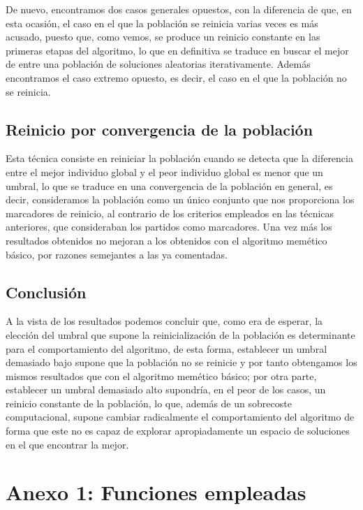 \documentclass[11pt,a4paper]{article}
\begin{document}
		\noindent De nuevo, encontramos dos casos generales opuestos, con la diferencia de que, en esta ocasión, el caso en el que la población se reinicia varias veces es más acusado, puesto que, como vemos, se produce un reinicio constante en las primeras etapas del algoritmo, lo que en definitiva se traduce en buscar el mejor de entre una población de soluciones aleatorias iterativamente. Además encontramos el caso extremo opuesto, es decir, el caso en el que la población no se reinicia.
	
	\subsection{Reinicio por convergencia de la población}
	
	\noindent Esta técnica consiste en reiniciar la población cuando se detecta que la diferencia entre el mejor individuo global y el peor individuo global es menor que un umbral, lo que se traduce en una convergencia de la población en general, es decir, consideramos la población como un único conjunto que nos proporciona los marcadores de reinicio, al contrario de los criterios empleados en las técnicas anteriores, que consideraban los partidos como marcadores. Una vez más los resultados obtenidos no mejoran a los obtenidos con el algoritmo memético básico, por razones semejantes a las ya comentadas.
	
	
	\subsection{Conclusión}
		
		\noindent  A la vista de los resultados podemos concluir que, como era de esperar, la elección del umbral que supone la reinicialización de la población es determinante para el comportamiento del algoritmo, de esta forma, establecer un umbral demasiado bajo supone que la población no se reinicie y por tanto obtengamos los mismos resultados que con el algoritmo memético básico; por otra parte, establecer un umbral demasiado alto supondría, en el peor de los casos, un reinicio constante de la población, lo que, además de un sobrecoste computacional, supone cambiar radicalmente el comportamiento del algoritmo de forma que este no es capaz de explorar apropiadamente un espacio de soluciones en el que encontrar la mejor.
		

\section{Anexo 1: Funciones empleadas}
\end{document}
